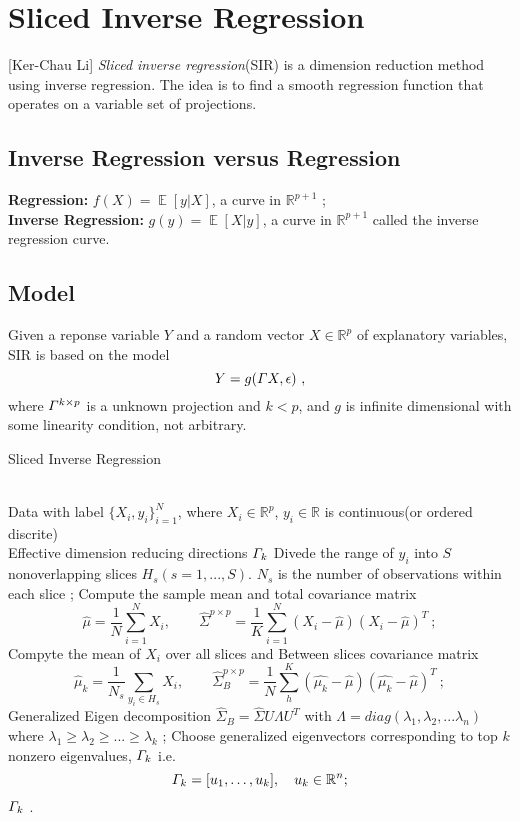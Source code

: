 \documentclass[twoside]{article}
\theoremstyle{definition}
\theoremstyle{definition}
\theoremstyle{remark}
\def\R{{\mathbb R}}
\begin{document}
\section{Sliced Inverse Regression} 


[Ker-Chau Li] \emph{Sliced inverse regression}(SIR) is a dimension reduction method using inverse regression. The idea is to find a smooth regression function that operates on a variable set of projections.
\subsection{Inverse Regression versus Regression}
\textbf{Regression:}  $f(X) = \mathop{\mathbb{E}}[y|X]$, a curve in $\mathbb{R}^{p+1}$ ;\\
\textbf{Inverse Regression:} $g(y) = \mathop{\mathbb{E}}[X|y]$, a curve in $\mathbb{R}^{p+1}$ called the inverse regression curve.
\subsection{Model}
Given a reponse variable $Y$ and a random vector $X\in \mathbb{R}^p$ of explanatory variables, SIR is based on the model 
$$Y = g(\mathnormal{\Gamma} X, \epsilon) \ ,$$
where $\mathnormal{\Gamma}^{k\times p}$ is a unknown projection and $k<p$, and $g$ is infinite dimensional with some linearity condition, not arbitrary.

\begin{algorithm}[htb]   
\caption{Sliced Inverse Regression}   
\label{alg:sir}   
\begin{algorithmic}[1] %
\REQUIRE ~~\\ %
 Data with label $\{X_i,y_i\}_{i=1}^N$, where $X_i\in \mathbb{R}^p$, $y_i\in \mathbb{R}$ is continuous(or ordered discrite)
\ENSURE ~~\\ %
Effective dimension reducing directions $\mathnormal{\Gamma}_k$
\STATE Divede the range of $y_i$ into $S$ nonoverlapping slices $H_s(s = 1,...,S)$. $N_s$ is the number of observations within each slice ; 
\STATE Compute the sample mean and total covariance matrix 
  $$\hat{\mu} = \frac{1}{N} \sum\limits_{i=1}^N X_i,\quad\quad\hat{\Sigma}^{p\times p} = \frac{1}{K} \sum_{i=1}^N(X_i - \hat{\mu})(X_i -\hat{\mu})^T \ ; $$   
\STATE Compyte the mean of $X_i$ over all slices and Between slices covariance matrix 
 $$ \hat{\mu}_k = \frac{1}{N_s} \sum\limits_{y_i\in H_s } X_i, \quad \quad \hat{\Sigma}_B^{p\times p} = \frac{1}{N} \sum_{h}^K(\hat{\mu_k} - \hat{\mu})(\hat{\mu_k} - \hat{\mu})^T\  ;$$
\STATE Generalized Eigen decomposition 
$\hat{\Sigma}_B = \hat{\Sigma} U\Lambda U^T $ with $\Lambda = diag(\lambda_1,\lambda_2,...\lambda_n)$ where  $\lambda_1 \ge \lambda_2 \ge ... \ge \lambda_k$ ;
\STATE Choose generalized eigenvectors corresponding to top $k$ nonzero eigenvalues, $\mathnormal{\Gamma}_k$ i.e.
$$\mathnormal{\Gamma}_k=[u_1,\ldots,u_k], \ \ \ u_k\in \R^n ;$$ 
\RETURN $\mathnormal{\Gamma_k}$ . %
\end{algorithmic}  
\end{algorithm}  
\end{document}
